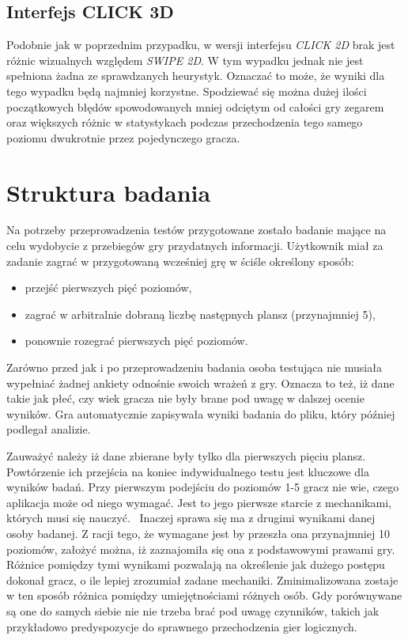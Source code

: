 \documentclass[a4paper,12pt,numbers=noenddot]{report}
\begin{document}
\subsection{Interfejs CLICK 3D}
Podobnie jak w poprzednim przypadku, w wersji interfejsu \textit{CLICK 2D} brak jest różnic wizualnych względem \textit{SWIPE 2D}. W tym wypadku jednak nie jest spełniona żadna ze sprawdzanych heurystyk. Oznaczać to może, że wyniki dla tego wypadku będą najmniej korzystne. Spodziewać się można dużej ilości początkowych błędów spowodowanych mniej odciętym od całości gry zegarem oraz większych różnic w statystykach podczas przechodzenia tego samego poziomu dwukrotnie przez pojedynczego gracza.
\section{Struktura badania}
Na potrzeby przeprowadzenia testów przygotowane zostało badanie mające na celu wydobycie z przebiegów gry przydatnych informacji. 
Użytkownik miał za zadanie zagrać w przygotowaną wcześniej grę w ściśle określony sposób:
\begin{itemize}
\item przejść pierwszych pięć poziomów,
\item zagrać w arbitralnie dobraną liczbę następnych plansz (przynajmniej 5),
\item ponownie rozegrać pierwszych pięć poziomów.
\end{itemize}
Zarówno przed jak i po przeprowadzeniu badania osoba testująca nie musiała wypełniać żadnej ankiety odnośnie swoich wrażeń z gry. Oznacza to też, iż dane takie jak płeć, czy wiek gracza nie były brane pod uwagę w dalszej ocenie wyników. Gra automatycznie zapisywała wyniki badania do pliku, który później podlegał analizie.

Zauważyć należy iż dane zbierane były tylko dla pierwszych pięciu plansz. Powtórzenie ich przejścia na koniec indywidualnego testu jest kluczowe dla wyników badań. Przy pierwszym podejściu do poziomów 1-5 gracz nie wie, czego aplikacja może od niego wymagać. Jest to jego pierwsze starcie z mechanikami, których musi się nauczyć. \
Inaczej sprawa się ma z drugimi wynikami danej osoby badanej. Z racji tego, że wymagane jest by przeszła ona przynajmniej 10 poziomów, założyć można, iż zaznajomiła się ona z podstawowymi prawami gry. Różnice pomiędzy tymi wynikami pozwalają na określenie jak dużego postępu dokonał gracz, o ile lepiej zrozumiał zadane mechaniki. Zminimalizowana zostaje w ten sposób różnica pomiędzy umiejętnościami różnych osób. Gdy porównywane są one do samych siebie nie nie trzeba brać pod uwagę czynników, takich jak przykładowo predyspozycje do sprawnego przechodzenia gier logicznych.
\end{document}
